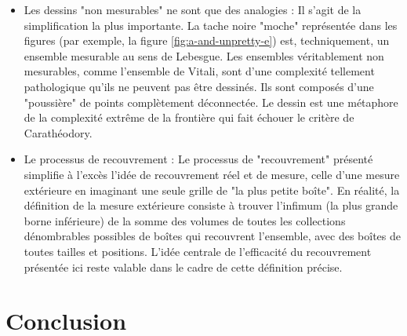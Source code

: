 \documentclass[a4paper]{article}
\begin{document}
\begin{itemize}
    
    \item 
        Les dessins "non mesurables" ne sont que des analogies : Il s'agit de la simplification la plus importante. La tache noire "moche" représentée dans les figures (par exemple, la figure \ref{fig:a-and-unpretty-e}) est, techniquement, un ensemble mesurable au sens de Lebesgue. Les ensembles véritablement non mesurables, comme l'ensemble de Vitali, sont d'une complexité tellement pathologique qu'ils ne peuvent pas être dessinés. Ils sont composés d'une "poussière" de points complètement déconnectée. Le dessin est une métaphore de la complexité extrême de la frontière qui fait échouer le critère de Carathéodory.
    \item 
        Le processus de recouvrement : Le processus de "recouvrement" présenté simplifie à l'excès l'idée de recouvrement réel et de mesure, celle d'une mesure extérieure en imaginant une seule grille de "la plus petite boîte". En réalité, la définition de la mesure extérieure consiste à trouver l'infimum (la plus grande borne inférieure) de la somme des volumes de toutes les collections dénombrables possibles de boîtes qui recouvrent l'ensemble, avec des boîtes de toutes tailles et positions. L'idée centrale de l'efficacité du recouvrement présentée ici reste valable dans le cadre de cette définition précise.
\end{itemize}%





\section{Conclusion}%
% 
\label{sec:Conclusion}%
\end{document}
